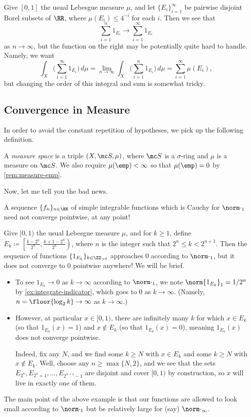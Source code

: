 \documentclass[../notes.tex]{subfiles}
\begin{document}
\begin{example}
	Give $[0,1]$ the usual Lebesgue measure $\mu$, and let $\{E_i\}_{i=1}^\infty$ be pairwise disjoint Borel subsets of $\RR$, where $\mu(E_i)\le 4^{-i}$ for each $i$. Then we see that
	\[\sum_{i=1}^n1_{E_i}\to\sum_{i=1}^\infty1_{E_i}\]
	as $n\to\infty$, but the function on the right may be potentially quite hard to handle. Namely, we want
	\[\int_X\Bigg(\sum_{i=1}^\infty1_{E_i}\Bigg)\,d\mu=\lim_{n\to\infty}\int_X\Bigg(\sum_{i=1}^n1_{E_i}\Bigg)\,d\mu=\sum_{i=1}^\infty\mu(E_i),\]
	but changing the order of this integral and sum is somewhat tricky.
\end{example}

\subsection{Convergence in Measure}
In order to avoid the constant repetition of hypotheses, we pick up the following definition.
\begin{definition}
	A \textit{measure space} is a triple $(X,\mc S,\mu)$, where $\mc S$ is a $\sigma$-ring and $\mu$ is a measure on $\mc S$. We also require $\mu(\emp)<\infty$ so that $\mu(\emp)=0$ by \autoref{rem:measure-emp}.
\end{definition}
Now, let me tell you the bad news.
\begin{warn}
	A sequence $\{f_n\}_{n\in\NN}$ of simple integrable functions which is Cauchy for $\norm\cdot_1$ need not converge pointwise, at any point!
\end{warn}
\begin{example} \label{ex:the-bad-news}
	Give $[0,1)$ the usual Lebesgue measure $\mu$, and for $k\ge1$, define $E_k\coloneqq\left[\frac{k-2^{n}}{2^{n}},\frac{k+1-2^{n}}{2^{n}}\right)$, where $n$ is the integer such that $2^n\le k<2^{n+1}$. Then the sequence of functions $\{1_{E_k}\}_{k\in\ZZ_{>0}}$ approaches $0$ according to $\norm\cdot_1$, but it does not converge to $0$ pointwise anywhere! We will be brief.
	\begin{itemize}
		\item To see $1_{E_k}\to0$ as $k\to\infty$ according to $\norm\cdot_1$, we note $\norm{1_{E_k}}_1=1/2^n$ by \autoref{ex:integrate-indicator}, which goes to $0$ as $k\to\infty$. (Namely, $n=\floor{\log_2k}\to\infty$ as $k\to\infty$.)
		\item However, at particular $x\in[0,1)$, there are infinitely many $k$ for which $x\in E_k$ (so that $1_{E_k}(x)=1$) and $x\notin E_k$ (so that $1_{E_k}(x)=0$), meaning $1_{E_k}(x)$ does not converge pointwise.
		
		Indeed, fix any $N$, and we find some $k\ge N$ with $x\in E_k$ and some $k\ge N$ with $x\notin E_k$. Well, choose any $n\ge\max\{N,2\}$, and we see that the sets $E_{2^n},E_{2^n+1},\ldots,E_{2^{n+1}-1}$ are disjoint and cover $[0,1)$ by construction, so $x$ will live in exactly one of them.
	\end{itemize}
\end{example}
The main point of the above example is that our functions are allowed to look small according to $\norm\cdot_1$ but be relatively large for (say) $\norm\cdot_\infty$.
\end{document}
